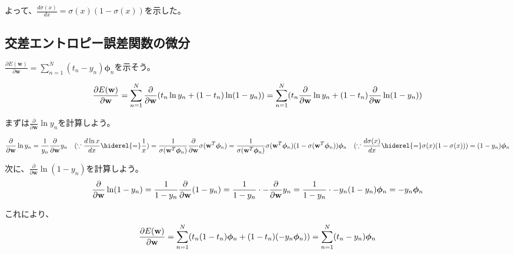 よって、$\frac{d \sigma(x)}{dx}= \sigma(x)(1-\sigma(x))$を示した。

\subsection*{交差エントロピー誤差関数の微分}

$\frac{\partial E(\mathbf{w})}{\partial \mathbf{w}} = \sum_{n=1}^N (t_n - y_n) \bm{\phi}_n$を示そう。

\begin{dmath*}
\frac{\partial E(\mathbf{w})}{\partial \mathbf{w}} = \sum_{n=1}^N \frac{\partial}{\partial \mathbf{w}}(  t_n \ln y_n + (1-t_n)\ln(1-y_n)  ) \\
= \sum_{n=1}^N  (  t_n \frac{\partial}{\partial \mathbf{w}} \ln y_n + (1-t_n) 	\frac{\partial}{\partial \mathbf{w}} \ln (1 - y_n))
\end{dmath*}

まずは$\frac{\partial}{\partial \mathbf{w}} \ln y_n$を計算しよう。

\begin{dmath*}
\frac{\partial}{\partial \mathbf{w}} \ln y_n = \frac{1}{y_n} \frac{\partial}{\partial \mathbf{w}} y_n \quad (\because  \frac{d \ln x}{dx} \hiderel{=} \frac{1}{x}) \\
=  \frac{1}{ \sigma(\mathbf{w}^T \bm{\phi}_n)} 	\frac{\partial}{\partial \mathbf{w}} \sigma(\mathbf{w}^T \bm{\phi}_n) \\
= \frac{1}{ \sigma(\mathbf{w}^T \bm{\phi}_n)}  \sigma(\mathbf{w}^T \bm{\phi}_n)  (1 -  \sigma(\mathbf{w}^T \bm{\phi}_n)  ) 	\bm{\phi}_n \quad (\because \frac{d \sigma(x)}{dx} \hiderel{=} \sigma(x)(1-\sigma(x))) \\
= (1 - y_n) \bm{\phi}_n
\end{dmath*}

次に、$\frac{\partial}{\partial \mathbf{w}} \ln (1 - y_n)$を計算しよう。
\begin{dmath*}
\frac{\partial}{\partial \mathbf{w}} \ln (1 - y_n) = \frac{1}{1 - y_n} \frac{\partial}{\partial \mathbf{w}} (1 - y_n) \\
= \frac{1}{1 - y_n} \cdot - \frac{\partial}{\partial \mathbf{w}} y_n	\\
= \frac{1}{1 - y_n} \cdot - y_n (1 - y_n) \bm{\phi}_n \\
= - y_n \bm{\phi}_n 
\end{dmath*}

これにより、
\begin{dmath*}
\frac{\partial E(\mathbf{w})}{\partial \mathbf{w}} = \sum_{n=1}^N  (  t_n  (1-t_n)\bm{\phi}_n   + (1-t_n)(-y_n \bm{\phi}_n))\\
= \sum_{n=1}^N (t_n - y_n) \bm{\phi}_n
\end{dmath*}

